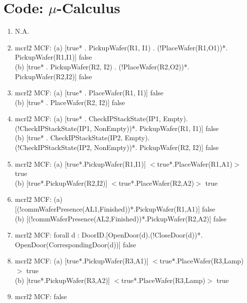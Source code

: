 \documentclass[a4paper,12pt]{article}
\begin{document}
	\section{Code: $\mu$-Calculus}
	\begin{enumerate}		
		\item N.A.
		\item mcrl2 MCF: \newline(a) [true* . PickupWafer(R1, I1) . (!PlaceWafer(R1,O1))*. \\PickupWafer(R1,I1)] false	
		\\ (b) [true* . PickupWafer(R2, I2) . (!PlaceWafer(R2,O2))*. \\PickupWafer(R2,I2)] false
		\item mcrl2 MCF: \newline(a) [true* . PlaceWafer(R1, I1)] false			
		\\ (b) [true* . PlaceWafer(R2, I2)] false					
		\item mcrl2 MCF: \newline(a) [true* . CheckIPStackState(IP1, Empty).\\ (!CheckIPStackState(IP1, NonEmpty))*. PickupWafer(R1, I1)] false					
		\\ (b) [true* . CheckIPStackState(IP2, Empty).\\ (!CheckIPStackState(IP2, NonEmpty))*. PickupWafer(R2, I2)] false	
		\item mcrl2 MCF: \newline(a) [true*.PickupWafer(R1,I1)] $<$true*.PlaceWafer(R1,A1)$>$ true					
		\\ (b) [true*.PickupWafer(R2,I2)] $<$true*.PlaceWafer(R2,A2)$>$ true
		\item mcrl2 MCF: \newline(a) [(!commWaferPresence(AL1,Finished))*.PickupWafer(R1,A1)] false					
		\\ (b) [(!commWaferPresence(AL2,Finished))*.PickupWafer(R2,A2)] false
		\item mcrl2 MCF: \newline [true*] forall d : DoorID.[OpenDoor(d).(!CloseDoor(d))*.\\ OpenDoor(CorrespondingDoor(d))] false
		\item mcrl2 MCF: \newline (a) [true*.PickupWafer(R3,A1)] $<$true*.PlaceWafer(R3,Lamp)$>$ true
		\\ (b)
		[true*.PickupWafer(R3,A2)] $<$true*.PlaceWafer(R3,Lamp)$>$ true
		\item mcrl2 MCF:  false

\end{enumerate}
\end{document}
